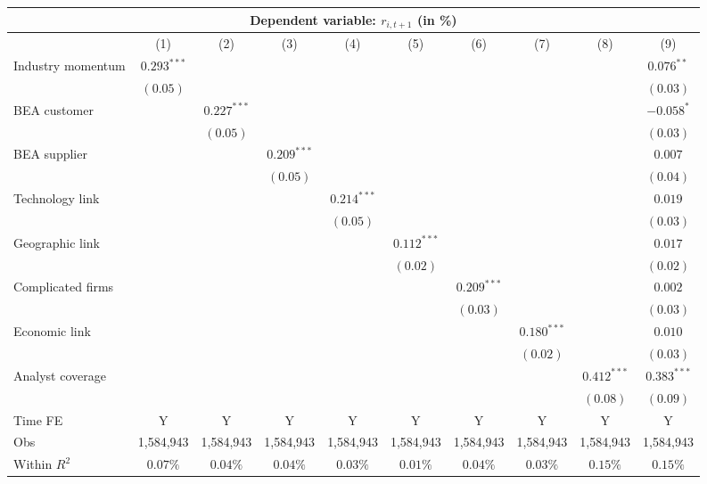 \documentclass[
]{article}
\author{}
\date{\vspace{-2.5em}}
\begin{document}
\begin{tabular}{lccccccccc}
   \toprule
                        \multicolumn{10}{c}{Dependent variable: $r_{i,t+1}$ (in \%)} \\
 \hline \vspace{5pt} & (1) & (2) & (3) & (4) & (5) & (6) & (7) & (8) & (9) \\ 
  Industry momentum & $0.293^{***}$ &  &  &  &  &  &  &  & $0.076^{**}$ \\ 
   & $(0.05)$ &  &  &  &  &  &  &  & $(0.03)$ \\ 
  BEA customer &  & $0.227^{***}$ &  &  &  &  &  &  & $-0.058^{*}$ \\ 
   &  & $(0.05)$ &  &  &  &  &  &  & $(0.03)$ \\ 
  BEA supplier &  &  & $0.209^{***}$ &  &  &  &  &  & $0.007$ \\ 
   &  &  & $(0.05)$ &  &  &  &  &  & $(0.04)$ \\ 
  Technology link &  &  &  & $0.214^{***}$ &  &  &  &  & $0.019$ \\ 
   &  &  &  & $(0.05)$ &  &  &  &  & $(0.03)$ \\ 
  Geographic link &  &  &  &  & $0.112^{***}$ &  &  &  & $0.017$ \\ 
   &  &  &  &  & $(0.02)$ &  &  &  & $(0.02)$ \\ 
  Complicated firms &  &  &  &  &  & $0.209^{***}$ &  &  & $0.002$ \\ 
   &  &  &  &  &  & $(0.03)$ &  &  & $(0.03)$ \\ 
  Economic link &  &  &  &  &  &  & $0.180^{***}$ &  & $0.010$ \\ 
   &  &  &  &  &  &  & $(0.02)$ &  & $(0.03)$ \\ 
  Analyst coverage &  &  &  &  &  &  &  & $0.412^{***}$ & $0.383^{***}$ \\ 
   \vspace{5pt} &  &  &  &  &  &  &  & $(0.08)$ & $(0.09)$ \\ 
   \vspace{5pt}Time FE & Y & Y & Y & Y & Y & Y & Y & Y & Y \\ 
  Obs & 1,584,943 & 1,584,943 & 1,584,943 & 1,584,943 & 1,584,943 & 1,584,943 & 1,584,943 & 1,584,943 & 1,584,943 \\ 
  Within $R^2$ & $0.07\%$ & $0.04\%$ & $0.04\%$ & $0.03\%$ & $0.01\%$ & $0.04\%$ & $0.03\%$ & $0.15\%$ & $0.15\%$ \\ 
   \bottomrule 
\end{tabular}
\end{document}
